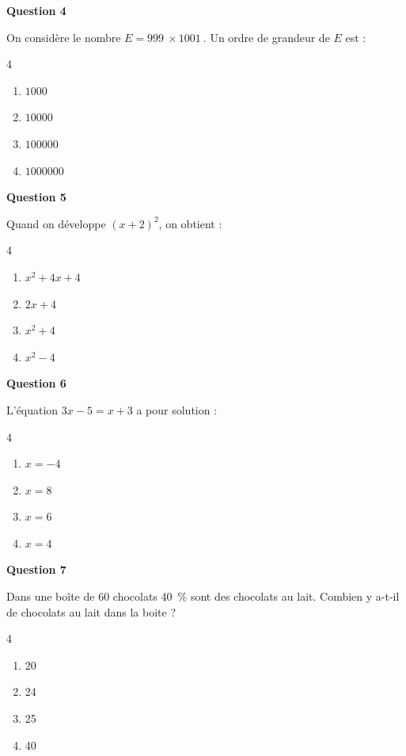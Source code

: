 \documentclass[10pt]{article}
\providecommand{\np}[2][]{{#2~#1}}
\begin{document}
\textbf{Question 4}

On considère le nombre $E = \np{999} \times \np{1001}$. Un ordre de grandeur de $E$ est :

\begin{multicols}{4}
\begin{enumerate}[label=\textbf{\alph* .}]
\item $\np{1000}$
\item $\np{10000}$
\item $\np{100000}$
\item $\np{1000000}$
\end{enumerate}
\end{multicols}

\textbf{Question 5}

Quand on développe $(x+2)^2$, on obtient :

\begin{multicols}{4}
\begin{enumerate}[label=\textbf{\alph* .}]
\item $x^2+4x+4$
\item $2x+4$
\item $x^2+4$
\item $x^2-4$
\end{enumerate}
\end{multicols}

\textbf{Question 6}

L'équation $ 3x - 5 = x + 3 $ a pour solution :

\begin{multicols}{4}
\begin{enumerate}[label=\textbf{\alph* .}]
\item $ x = -4 $
\item $ x = 8 $
\item $ x = 6 $
\item $ x = 4 $
\end{enumerate}
\end{multicols}

\pagebreak

\textbf{Question 7}

Dans une boîte de 60 chocolats 40~\% sont des chocolats au lait. Combien y a-t-il de chocolats au lait dans la boite ?

\begin{multicols}{4}
\begin{enumerate}[label=\textbf{\alph* .}]
\item 20
\item 24
\item 25
\item 40
\end{enumerate}
\end{multicols}
\end{document}

